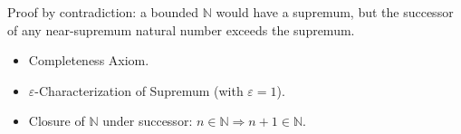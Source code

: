 \begin{remark*}
Proof by contradiction: a bounded $\mathbb{N}$ would have a supremum, but
the successor of any near-supremum natural number exceeds the supremum.
\end{remark*}

\begin{remark*}[Dependencies]
\begin{itemize}
  \item Completeness Axiom.
  \item $\varepsilon$-Characterization of Supremum (with $\varepsilon = 1$).
  \item Closure of $\mathbb{N}$ under successor: $n \in \mathbb{N} \Rightarrow n + 1 \in \mathbb{N}$.
\end{itemize}
\end{remark*}
